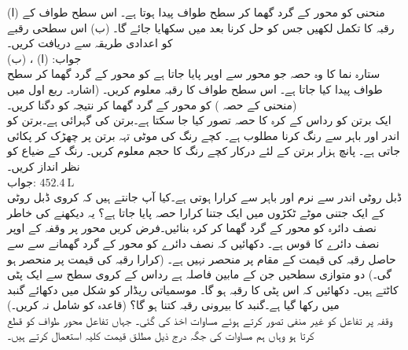    (ا) منحنی  کو  محور کے گرد گھما کر سطح طواف پیدا ہوتا ہے۔ اس سطح طواف کے رقبہ کا تکمل لکھیں جس کو حل کرنا بعد میں سکھایا جائے گا۔ (ب) اس سطحی رقبے کو اعدادی طریقہ سے دریافت کریں۔\\
جواب:\quad
(ا) ، (ب) 
\\
ستارہ نما  کا وہ حصہ جو  محور سے اوپر پایا جاتا ہے کو  محور کے گرد گھما کر سطح طواف پیدا کیا جاتا ہے۔ اس سطح طواف کا رقبہ معلوم کریں۔ (اشارہ۔ ربع اول میں منحنی کے حصہ ) کو  محور کے گرد گھما کر نتیجہ  کو دگنا کریں۔)
\\
ایک برتن کو رداس  کے کرہ کا حصہ تصور کیا جا سکتا ہے۔برتن کی گہرائی  ہے۔برتن کو اندر اور باہر سے رنگ کرنا مطلوب ہے۔ کچے رنگ کی  موٹی تہہ برتن پر چھڑک کر پکائی جاتی ہے۔ پانچ ہزار برتن کے لئے درکار کچے رنگ کا حجم معلوم کریں۔ رنگ کے ضیاع کو نظر انداز کریں۔\\
جواب:\quad
$\SI{452.4}{\liter}$
\\
ڈبل روٹی اندر سے نرم اور باہر سے کرارا ہوتی ہے۔کیا آپ جانتے ہیں کہ کروی ڈبل روٹی کے ایک جتنی موٹے ٹکڑوں میں  ایک جتنا کرارا حصہ پایا جاتا ہے؟ یہ دیکھنے کی خاطر نصف دائرہ  کو  محور کے گرد گھما کر کرہ بنائیں۔فرض کریں محور  پر وقفہ  کے اوپر نصف دائرے کا قوس  ہے۔ دکھائیں کہ نصف دائرے کو  محور کے گرد گھمانے سے  سے حاصل رقبہ  کی قیمت  کے مقام پر منحصر نہیں ہے۔ (کرارا رقبہ کی قیمت  پر منحصر ہو گی۔)
دو متوازی سطحیں جن کے مابین فاصلہ  ہے رداس  کے کروی سطح سے ایک پٹی کاٹتے ہیں۔ دکھائیں کہ اس پٹی کا رقبہ  ہو گا۔   
موسمیاتی ریڈار کو شکل میں دکھائے گنبد میں رکھا گیا ہے۔گنبد کا بیرونی رقبہ کتنا ہو گا؟ (قاعدہ کو شامل نہ کریں۔)
\\
وقفہ  پر تفاعل  کو غیر منفی تصور کرتے ہوئے  مساوات  اخذ کی گئی۔ جہاں تفاعل محور طواف کو قطع کرتا ہو وہاں ہم مساوات  کی جگہ درج ذیل مطلق قیمت کلیہ استعمال کرتے ہیں۔
